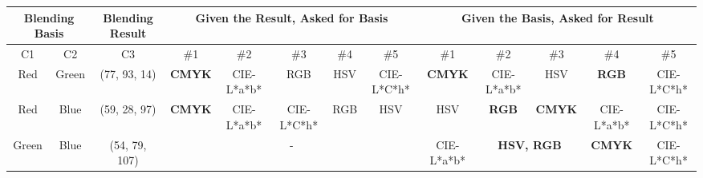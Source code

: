 \begin{table}[htbp]
  \resizebox{\textwidth}{!} {
  \begin{tabular}{@{}cccccccccccccc@{}}
    \toprule
    \multicolumn{2}{c}{Blending Basis}     & \multicolumn{2}{c}{Blending Result}                                                                                   & \multicolumn{5}{c}{Given the Result, Asked for Basis}                                                                                                                         & \multicolumn{5}{c}{Given the Basis, Asked for Result}                                                                                                                                  \\ \midrule
    C1      & C2                           & \multicolumn{2}{c|}{C3}                                                                                               & \#1                                & \#2                                & \#3                             & \#4                             & \multicolumn{1}{c|}{\#5}        & \#1                                & \#2                                & \#3                                & \#4                                & \multicolumn{1}{c|}{\#5}           \\ \midrule
    Red     & \multicolumn{1}{c|}{Green}   & \multicolumn{2}{c|}{\cellcolor[HTML]{FFFF00}(77, 93, 14)}                                                             & \multicolumn{1}{c|}{\textbf{CMYK}} & \multicolumn{1}{c|}{CIE-L*a*b*}    & \multicolumn{1}{c|}{RGB}        & \multicolumn{1}{c|}{HSV}        & \multicolumn{1}{c|}{CIE-L*C*h*} & \multicolumn{1}{c|}{\textbf{CMYK}} & \multicolumn{1}{c|}{CIE-L*a*b*}    & \multicolumn{1}{c|}{HSV}           & \multicolumn{1}{c|}{\textbf{RGB}}  & \multicolumn{1}{c|}{CIE-L*C*h*}    \\ \midrule
    Red     & \multicolumn{1}{c|}{Blue}    & \multicolumn{2}{c|}{\cellcolor[HTML]{FF00FF}(59, 28, 97)}                                                             & \multicolumn{1}{c|}{\textbf{CMYK}} & \multicolumn{1}{c|}{CIE-L*a*b*}    & \multicolumn{1}{c|}{CIE-L*C*h*} & \multicolumn{1}{c|}{RGB}        & \multicolumn{1}{c|}{HSV}        & \multicolumn{1}{c|}{HSV}           & \multicolumn{1}{c|}{\textbf{RGB}}  & \multicolumn{1}{c|}{\textbf{CMYK}} & \multicolumn{1}{c|}{CIE-L*a*b*}    & \multicolumn{1}{c|}{CIE-L*C*h*}    \\ \midrule
    Green   & \multicolumn{1}{c|}{Blue}    & \multicolumn{2}{c|}{\cellcolor[HTML]{00FFFF}(54, 79, 107)}                                                            & \multicolumn{5}{c|}{-}                                                                                                                                                        & \multicolumn{1}{c|}{CIE-L*a*b*}    & \multicolumn{2}{c|}{\textbf{HSV, RGB}}                                  & \multicolumn{1}{c|}{\textbf{CMYK}} & \multicolumn{1}{c|}{CIE-L*C*h*}    \\ \midrule

\end{tabular}}
\end{table}
